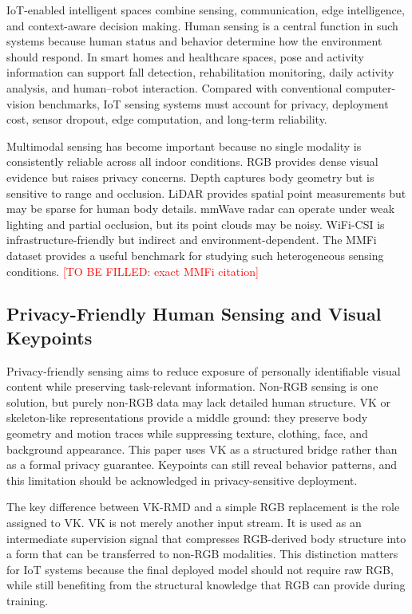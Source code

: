 \documentclass[journal]{IEEEtran}
\newcommand{\todo}[1]{\textcolor{red}{[TO BE FILLED: #1]}}
\begin{document}
IoT-enabled intelligent spaces combine sensing, communication, edge intelligence, and context-aware decision making. Human sensing is a central function in such systems because human status and behavior determine how the environment should respond. In smart homes and healthcare spaces, pose and activity information can support fall detection, rehabilitation monitoring, daily activity analysis, and human--robot interaction. Compared with conventional computer-vision benchmarks, IoT sensing systems must account for privacy, deployment cost, sensor dropout, edge computation, and long-term reliability.

Multimodal sensing has become important because no single modality is consistently reliable across all indoor conditions. RGB provides dense visual evidence but raises privacy concerns. Depth captures body geometry but is sensitive to range and occlusion. LiDAR provides spatial point measurements but may be sparse for human body details. mmWave radar can operate under weak lighting and partial occlusion, but its point clouds may be noisy. WiFi-CSI is infrastructure-friendly but indirect and environment-dependent. The MMFi dataset provides a useful benchmark for studying such heterogeneous sensing conditions. \todo{exact MMFi citation}

\subsection{Privacy-Friendly Human Sensing and Visual Keypoints}

Privacy-friendly sensing aims to reduce exposure of personally identifiable visual content while preserving task-relevant information. Non-RGB sensing is one solution, but purely non-RGB data may lack detailed human structure. VK or skeleton-like representations provide a middle ground: they preserve body geometry and motion traces while suppressing texture, clothing, face, and background appearance. This paper uses VK as a structured bridge rather than as a formal privacy guarantee. Keypoints can still reveal behavior patterns, and this limitation should be acknowledged in privacy-sensitive deployment.

The key difference between VK-RMD and a simple RGB replacement is the role assigned to VK. VK is not merely another input stream. It is used as an intermediate supervision signal that compresses RGB-derived body structure into a form that can be transferred to non-RGB modalities. This distinction matters for IoT systems because the final deployed model should not require raw RGB, while still benefiting from the structural knowledge that RGB can provide during training.
\end{document}
